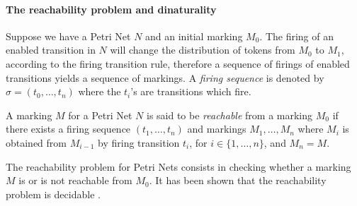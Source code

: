 \paragraph{The reachability problem and dinaturality} Suppose we have a Petri Net $N$ and an initial marking $M_0$. The firing of an enabled transition in $N$ will change the distribution of tokens from $M_0$ to $M_1$, according to the firing transition rule, therefore a sequence of firings of enabled transitions yields a sequence of markings. A \emph{firing sequence} is denoted by $\sigma = (t_0,\dots,t_n)$ where the $t_i$'s are transitions which fire.

\begin{definition}
	A marking $M$ for a Petri Net $N$ is said to be \emph{reachable} from a marking $M_0$ if there exists a firing sequence $(t_1,\dots,t_n)$ and markings $M_1,\dots,M_n$ where $M_i$ is obtained from $M_{i-1}$ by firing transition $t_i$, for $i \in \{1,\dots,n\}$, and $M_{n}=M$. 
\end{definition}

The reachability problem for Petri Nets consists in checking whether a marking $M$ is or is not reachable from $M_0$. It has been shown that the reachability problem is decidable \cite{kosaraju_decidability_1982,mayr_algorithm_1981}.


